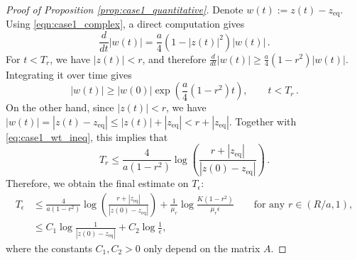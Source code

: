 \documentclass[10pt]{article}
\theoremstyle{definition}
\theoremstyle{definition}
\numberwithin{equation}{section}
\newcommand{\zeq}{z_{\mathrm{eq}}}
\begin{document}
\begin{proof}[Proof of Proposition \ref{prop:case1_quantitative}]
Denote $w(t) := z(t) - \zeq$.
Using \eqref{eqn:case1_complex}, a direct computation gives
\begin{equation*}
\frac{d}{dt} |w(t)| = \frac{a}{4} (1 - |z(t)|^2) |w(t)| \, .
\end{equation*}
For $t < T_r$, we have $|z(t)| < r$, and therefore $\frac{d}{dt} |w(t)| \geq \frac{a}{4} (1 - r^2) |w(t)|$.
Integrating it over time gives
\begin{equation}\label{eq:case1_wt_ineq}
|w(t)| \geq |w(0)| \exp \left( \frac{a}{4} (1 - r^2) t \right), \qquad t < T_r \, .
\end{equation}
On the other hand, since $|z(t)| < r$, we have $|w(t)| = |z(t) - \zeq| \leq |z(t)| + |\zeq| < r + |\zeq|$.
Together with \eqref{eq:case1_wt_ineq}, this implies that
\begin{equation*}
    T_r \leq \frac{4}{a(1-r^2)} \log \left( \frac{r + |\zeq|}{|z(0) - \zeq|} \right) \, .
\end{equation*}
Therefore, we obtain the final estimate on $T_{\epsilon}$:
\begin{equation*}
\begin{aligned}
T_{\epsilon} &\leq \frac{4}{a(1-r^2)} \log \left( \frac{r + |\zeq|}{|z(0) - \zeq|} \right) + \frac{1}{\mu_r} \log \frac{K(1-r^2)}{\mu_r \epsilon} \qquad \text{for any } r \in (R/a, 1),\\
&\leq C_1 \log \frac{1}{|z(0) - \zeq|} + C_2 \log \frac{1}{\epsilon},
\end{aligned}
\end{equation*}
where the constants $C_1, C_2 > 0$ only depend on the matrix $A$.
\end{proof}
\end{document}
